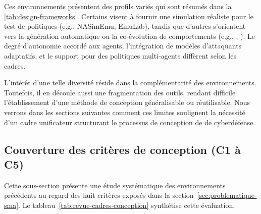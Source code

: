 \medskip

Ces environnements présentent des profils variés qui sont résumés dans la \autoref{tab:design-frameworks}. Certains visent à fournir une simulation réaliste pour le test de politiques (e.g., NASimEmu, EmuLab), tandis que d'autres s'orientent vers la génération automatique ou la co-évolution de comportements (e.g., , ). Le degré d'autonomie accordé aux agents, l'intégration de modèles d'attaquants adaptatifs, et le support pour des politiques multi-agents diffèrent selon les cadres.

L'intérêt d'une telle diversité réside dans la complémentarité des environnements. Toutefois, il en découle aussi une fragmentation des outils, rendant difficile l'établissement d'une méthode de conception généralisable ou réutilisable. Nous verrons dans les sections suivantes comment ces limites soulignent la nécessité d'un cadre unificateur structurant le processus de conception de  de cyberdéfense.

\subsection{Couverture des critères de conception (C1 à C5)}

Cette sous-section présente une étude systématique des environnements précédents au regard des huit critères exposés dans la section~\ref{sec:problematique-sma}. Le tableau~\ref{tab:revue-cadres-conception} synthétise cette évaluation.

